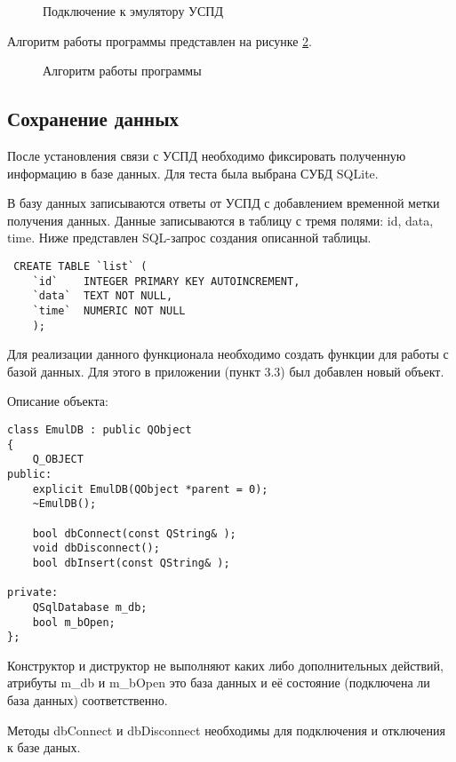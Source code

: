 \begin{figure}[h!]
 \caption{Подключение к эмулятору УСПД}
 \label{window1:window1}
\end{figure}

Алгоритм работы программы представлен на рисунке \ref{alg1:alg1}.

\begin{figure}[h!]
 \caption{Алгоритм работы программы}
 \label{alg1:alg1}
\end{figure}


\subsection{Сохранение данных}

После установления связи с УСПД необходимо фиксировать полученную информацию в базе данных. Для теста была выбрана СУБД SQLite. 

В базу данных записываются ответы от УСПД с добавлением временной метки получения данных. Данные записываются в таблицу с тремя полями: id, data, time. Ниже представлен SQL-запрос создания описанной таблицы.

\begin{lstlisting}
 CREATE TABLE `list` (
	`id`	INTEGER PRIMARY KEY AUTOINCREMENT,
	`data`	TEXT NOT NULL,
	`time`	NUMERIC NOT NULL
	);
\end{lstlisting}


Для реализации данного функционала необходимо создать функции для работы с базой данных. Для этого в приложении (пункт 3.3) был добавлен новый объект. 

Описание объекта:

\begin{lstlisting}
class EmulDB : public QObject
{
    Q_OBJECT
public:
    explicit EmulDB(QObject *parent = 0);
    ~EmulDB();

    bool dbConnect(const QString& );
    void dbDisconnect();
    bool dbInsert(const QString& );

private:
    QSqlDatabase m_db;
    bool m_bOpen;
};
\end{lstlisting}

Конструктор и диструктор не выполняют каких либо дополнительных действий, атрибуты m\_db и m\_bOpen это база данных и её состояние (подключена ли база данных) соответственно.

Методы dbConnect и dbDisconnect необходимы для подключения и отключения к базе даных. 

